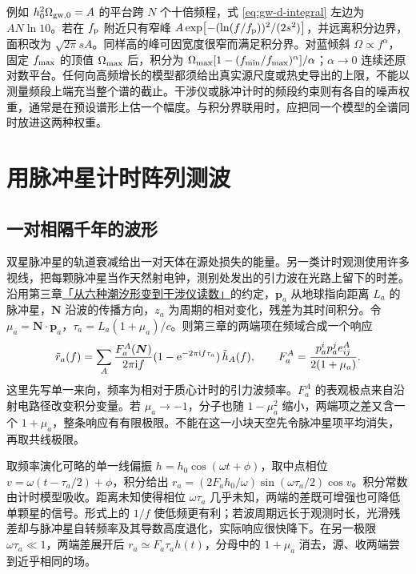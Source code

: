 例如 $h_0^2\Omega_{{\rm gw},0}=A$ 的平台跨 $N$ 个十倍频程，式 \eqref{eq:gw-d-integral} 左边为 $A N\ln10$。若在 $f_{\rm p}$ 附近只有窄峰 $A\exp[-(\ln(f/f_{\rm p}))^2/(2s^2)]$，并远离积分边界，面积改为 $\sqrt{2\pi}sA$。同样高的峰可因宽度很窄而满足积分界。对蓝倾斜 $\Omega\propto f^\alpha$，固定 $f_{\rm max}$ 的顶值 $\Omega_{\rm max}$ 后，积分为 $\Omega_{\rm max}[1-(f_{\rm min}/f_{\rm max})^\alpha]/\alpha$；$\alpha\to0$ 连续还原对数平台。任何向高频增长的模型都须给出真实源尺度或热史导出的上限，不能以测量频段上端充当整个谱的截止。干涉仪或脉冲计时的频段约束则有各自的噪声权重，通常是在预设谱形上估一个幅度。与积分界联用时，应把同一个模型的全谱同时放进这两种权重。

\section{用脉冲星计时阵列测波}\label{sec:gw-e-pta}
\subsection{一对相隔千年的波形}
双星脉冲星的轨道衰减给出一对天体在源处损失的能量。另一类计时观测使用许多视线，把每颗脉冲星当作天然射电钟，测别处发出的引力波在光路上留下的时差。沿用第三章\hyperlink{subsection.3.12.9}{「从六种潮汐形变到干涉仪读数」}的约定，$\bm p_a$ 从地球指向距离 $L_a$ 的脉冲星，$\bm N$ 沿波的传播方向，$z_a$ 为周期的相对变化，残差为其时间积分。令 $\mu_a=\bm N\cdot\bm p_a$，$\tau_a=L_a(1+\mu_a)/c$。则第三章的两端项在频域合成一个响应
\begin{equation}\label{eq:gw-e-pta}
 \tilde r_a(f)=\sum_A \frac{F_a^A(\bm N)}{2\pi\mathrm{i} f}
 (1-\mathrm{e}^{-2\pi\mathrm{i} f\tau_a})\,\tilde h_A(f),\qquad
 F_a^A=\frac{p_a^ip_a^j e_{ij}^A}{2(1+\mu_a)} .
\end{equation}
这里先写单一来向，频率为相对于质心计时的引力波频率。$F_a^A$ 的表观极点来自沿射电路径改变积分变量。若 $\mu_a\to-1$，分子也随 $1-\mu_a^2$ 缩小，两端项之差又含一个 $1+\mu_a$，整条响应有有限极限。不能在这一小块天空先令脉冲星项平均消失，再取共线极限。

取频率演化可略的单一线偏振 $h=h_0\cos(\omega t+\phi)$，取中点相位 $v=\omega(t-\tau_a/2)+\phi$，积分给出 $r_a=(2F_a h_0/\omega)\sin(\omega\tau_a/2)\cos v$。积分常数由计时模型吸收。距离未知使得相位 $\omega\tau_a$ 几乎未知，两端的差既可增强也可降低单颗星的信号。形式上的 $1/f$ 使低频更有利；若波周期远长于观测时长，光滑残差却与脉冲星自转频率及其导数高度退化，实际响应很快降下。在另一极限 $\omega\tau_a\ll1$，两端差展开后 $r_a\simeq F_a\tau_a h(t)$，分母中的 $1+\mu_a$ 消去，源、收两端尝到近乎相同的场。

